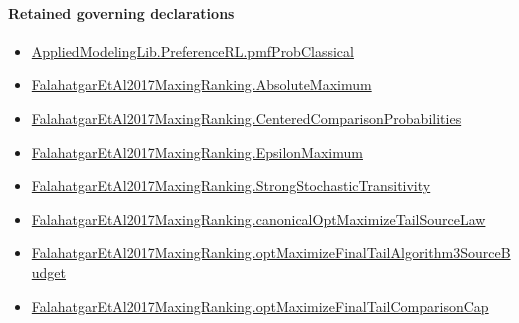 \documentclass[10pt]{article}
\begin{document}
\paragraph{Retained governing declarations}
\begin{itemize}\raggedright
\item \hyperlink{governing-declaration-7adb8ad5ca0d515c}{Applied\allowbreak{}Modeling\allowbreak{}Lib.\allowbreak{}Preference\allowbreak{}RL.\allowbreak{}pmf\allowbreak{}Prob\allowbreak{}Classical}
\item \hyperlink{paper-prerequisite-9c0d6111ba7505a4}{Falahatgar\allowbreak{}Et\allowbreak{}Al2017\allowbreak{}Maxing\allowbreak{}Ranking.\allowbreak{}Absolute\allowbreak{}Maximum}
\item \hyperlink{paper-prerequisite-b99b697ef57f53ce}{Falahatgar\allowbreak{}Et\allowbreak{}Al2017\allowbreak{}Maxing\allowbreak{}Ranking.\allowbreak{}Centered\allowbreak{}Comparison\allowbreak{}Probabilities}
\item \hyperlink{paper-prerequisite-f40acf814741691d}{Falahatgar\allowbreak{}Et\allowbreak{}Al2017\allowbreak{}Maxing\allowbreak{}Ranking.\allowbreak{}Epsilon\allowbreak{}Maximum}
\item \hyperlink{paper-prerequisite-76807884cf8ad345}{Falahatgar\allowbreak{}Et\allowbreak{}Al2017\allowbreak{}Maxing\allowbreak{}Ranking.\allowbreak{}Strong\allowbreak{}Stochastic\allowbreak{}Transitivity}
\item \hyperlink{governing-declaration-63ab6d2aea9237fa}{Falahatgar\allowbreak{}Et\allowbreak{}Al2017\allowbreak{}Maxing\allowbreak{}Ranking.\allowbreak{}canonical\allowbreak{}Opt\allowbreak{}Maximize\allowbreak{}Tail\allowbreak{}Source\allowbreak{}Law}
\item \hyperlink{governing-declaration-4303d1682394d5b9}{Falahatgar\allowbreak{}Et\allowbreak{}Al2017\allowbreak{}Maxing\allowbreak{}Ranking.\allowbreak{}opt\allowbreak{}Maximize\allowbreak{}Final\allowbreak{}Tail\allowbreak{}Algorithm3\allowbreak{}Source\allowbreak{}Budget}
\item \hyperlink{governing-declaration-cf21e3d67562ad66}{Falahatgar\allowbreak{}Et\allowbreak{}Al2017\allowbreak{}Maxing\allowbreak{}Ranking.\allowbreak{}opt\allowbreak{}Maximize\allowbreak{}Final\allowbreak{}Tail\allowbreak{}Comparison\allowbreak{}Cap}
\end{itemize}
\end{document}
